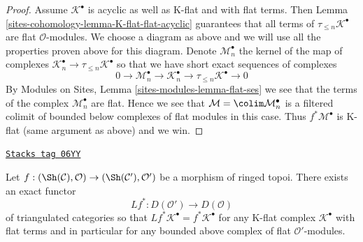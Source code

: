 \begin{proof}
\medskip\noindent
Assume $\mathcal{K}^\bullet$ is acyclic as well as K-flat and
with flat terms. Then Lemma \ref{sites-cohomology-lemma-K-flat-flat-acyclic}
guarantees that all terms of $\tau_{\leq n}\mathcal{K}^\bullet$
are flat $\mathcal{O}$-modules. We choose a diagram as above and
we will use all the properties proven above for this diagram.
Denote $\mathcal{M}_n^\bullet$ the kernel of the map of complexes
$\mathcal{K}_n^\bullet \to \tau_{\leq n}\mathcal{K}^\bullet$
so that we have short exact sequences of complexes
$$
0 \to \mathcal{M}_n^\bullet \to \mathcal{K}_n^\bullet \to
\tau_{\leq n}\mathcal{K}^\bullet \to 0
$$
By Modules on Sites, Lemma \ref{sites-modules-lemma-flat-ses}
we see that the terms of the complex $\mathcal{M}_n^\bullet$ are flat.
Hence we see that $\mathcal{M} = \colim \mathcal{M}_n^\bullet$
is a filtered colimit of bounded below complexes of flat modules
in this case. Thus $f^*\mathcal{M}^\bullet$ is K-flat
(same argument as above) and we win.
\end{proof}

\begin{lemma}
\label{sites-cohomology-lemma-derived-base-change}
\href{https://stacks.math.columbia.edu/tag/06YY}{\texttt{Stacks tag 06YY}}

Let $f : (\Sh(\mathcal{C}), \mathcal{O}) \to (\Sh(\mathcal{C}'), \mathcal{O}')$
be a morphism of ringed topoi. There exists an exact functor
$$
Lf^* : D(\mathcal{O}') \longrightarrow D(\mathcal{O})
$$
of triangulated categories so that
$Lf^*\mathcal{K}^\bullet = f^*\mathcal{K}^\bullet$ for any
K-flat complex $\mathcal{K}^\bullet$ with flat terms and
in particular for any bounded above complex of flat $\mathcal{O}'$-modules.
\end{lemma}

